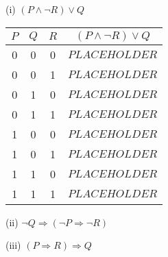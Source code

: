 \documentclass{article}
\begin{document}
(i) $(P \land \neg R) \lor Q$
\begin{tabular}{|c|c|c|c|}
    \hline
    $P$ & $Q$ & $R$ & $(P \land \neg R) \lor Q$ \\
    \hline
    0   & 0   & 0   & $PLACEHOLDER$             \\
    0   & 0   & 1   & $PLACEHOLDER$             \\
    0   & 1   & 0   & $PLACEHOLDER$             \\
    0   & 1   & 1   & $PLACEHOLDER$             \\
    1   & 0   & 0   & $PLACEHOLDER$             \\
    1   & 0   & 1   & $PLACEHOLDER$             \\
    1   & 1   & 0   & $PLACEHOLDER$             \\
    1   & 1   & 1   & $PLACEHOLDER$             \\
    \hline
\end{tabular}

(ii) $\neg Q \Rightarrow (\neg P \Rightarrow \neg R)$

(iii) $(P \Rightarrow R) \Rightarrow Q$
\end{document}

